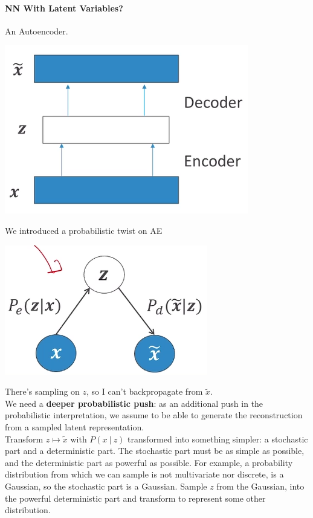 \documentclass[10pt]{report}
\begin{document}
\paragraph{NN With Latent Variables?} An Autoencoder.
\begin{center}
	\includegraphics[scale=0.5]{140.png}
\end{center}
We introduced a probabilistic twist on AE
\begin{center}
	\includegraphics[scale=0.5]{141.png}
\end{center}
There's sampling on $z$, so I can't backpropagate from $\tilde{x}$.\\
We need a \textbf{deeper probabilistic push}: as an additional push in the probabilistic interpretation, we assume to be able to generate the reconstruction from a sampled latent representation.\\
Transform $z\mapsto\tilde{x}$ with $P(x\:|\:z)$ transformed into something simpler: a stochastic part and a deterministic part. The stochastic part must be as simple as possible, and the deterministic part as powerful as possible. For example, a probability distribution from which we can sample is not multivariate nor discrete, is a Gaussian, so the stochastic part is a Gaussian. Sample $z$ from the Gaussian, into the powerful deterministic part and transform to represent some other distribution.\\
\end{document}
